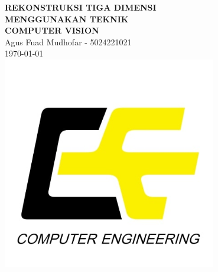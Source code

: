 \documentclass[12pt,a4paper]{article}
\begin{document}
\begin{titlepage}
    \begin{center}
        {\LARGE \textbf{
            REKONSTRUKSI TIGA DIMENSI\\
            MENGGUNAKAN TEKNIK\\[0.4cm]
            COMPUTER VISION
        }}\\[1.5cm]
        {\large Agus Fuad Mudhofar - 5024221021}\\[0.3cm]
        {\large \today}\\
        \includegraphics[width=0.7\textwidth]{Computer-Engineering-1.jpg}\\[1cm]
    \end{center}
\end{titlepage}
\thispagestyle{empty}

\end{document}
